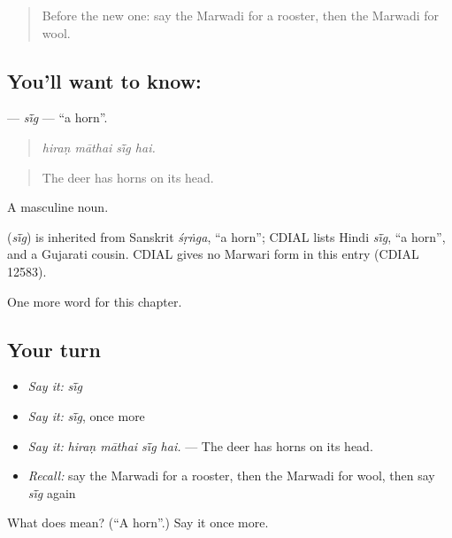 \begin{quote}
Before the new one: say the Marwadi for a rooster, then the Marwadi for wool.
\end{quote}

\subsection*{You'll want to know: }
\textbf{} — \emph{sī̃g} — \textquotedblleft{}a horn\textquotedblright{}.

\begin{quote}
   
\end{quote}

\begin{quote}
\emph{hiraṇ māthai sī̃g hai.}
\end{quote}

\begin{quote}
The deer has horns on its head.
\end{quote}

A masculine noun.

\begin{cousinweb}
\textbf{} (\emph{sī̃g}) is inherited from Sanskrit \emph{śṛṅga}, \textquotedblleft{}a horn\textquotedblright{}; CDIAL lists Hindi \emph{sī̃g}, \textquotedblleft{}a horn\textquotedblright{}, and a Gujarati cousin. CDIAL gives no Marwari form in this entry (CDIAL 12583).
\end{cousinweb}

\begin{grammarlens}[title={What you've built}]
One more word for this chapter.
\end{grammarlens}

\subsection*{Your turn}
\begin{itemize}
\raggedright
  \item \emph{Say it:} \emph{sī̃g}
  \item \emph{Say it:} \emph{sī̃g}, once more
  \item \emph{Say it:} \emph{hiraṇ māthai sī̃g hai.} — The deer has horns on its head.
  \item \emph{Recall:} say the Marwadi for a rooster, then the Marwadi for wool, then say \emph{sī̃g} again
\end{itemize}

\begin{tcolorbox}[breakable,colback=teal!4,colframe=teal!35!black,title={Before you move on}]
What does  mean? (\textquotedblleft{}A horn\textquotedblright{}.) Say it once more.
\end{tcolorbox}
